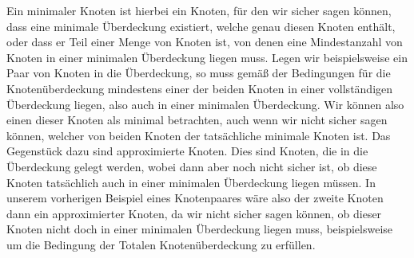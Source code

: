 \documentclass[12pt,onecolumn, notitlepage]{scrartcl}
\begin{document}
Ein minimaler Knoten ist hierbei ein Knoten, für den wir sicher sagen können, dass eine minimale Überdeckung existiert, welche genau diesen Knoten enthält, oder dass er Teil einer Menge von Knoten ist, von denen eine Mindestanzahl von Knoten in einer minimalen Überdeckung liegen muss. Legen wir beispielsweise ein Paar von Knoten in die Überdeckung, so muss gemäß der Bedingungen für die Knotenüberdeckung mindestens einer der beiden Knoten in einer vollständigen Überdeckung liegen, also auch in einer minimalen Überdeckung. Wir können also einen dieser Knoten als minimal betrachten, auch wenn wir nicht sicher sagen können, welcher von beiden Knoten der tatsächliche minimale Knoten ist. Das Gegenstück dazu sind approximierte Knoten. Dies sind Knoten, die in die Überdeckung gelegt werden, wobei dann aber noch nicht sicher ist, ob diese Knoten tatsächlich auch in einer minimalen Überdeckung liegen müssen. In unserem vorherigen Beispiel eines Knotenpaares wäre also der zweite Knoten dann ein approximierter Knoten, da wir nicht sicher sagen können, ob dieser Knoten nicht doch in einer minimalen Überdeckung liegen muss, beispielsweise um die Bedingung der Totalen Knotenüberdeckung zu erfüllen.\newline
\end{document}
